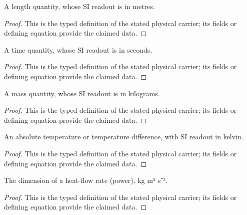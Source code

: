 \begin{definition}
  \label{def:physics:IPhO_2026_4_C_6:aux001}
  A length quantity, whose SI readout is in metres.
\end{definition}
\begin{proof}
  This is the typed definition of the stated physical carrier; its fields or defining equation provide the claimed data.
\end{proof}

\begin{definition}
  \label{def:physics:IPhO_2026_4_C_6:aux002}
  A time quantity, whose SI readout is in seconds.
\end{definition}
\begin{proof}
  This is the typed definition of the stated physical carrier; its fields or defining equation provide the claimed data.
\end{proof}

\begin{definition}
  \label{def:physics:IPhO_2026_4_C_6:aux003}
  A mass quantity, whose SI readout is in kilograms.
\end{definition}
\begin{proof}
  This is the typed definition of the stated physical carrier; its fields or defining equation provide the claimed data.
\end{proof}

\begin{definition}
  \label{def:physics:IPhO_2026_4_C_6:aux004}
  An absolute temperature or temperature difference, with SI readout in kelvin.
\end{definition}
\begin{proof}
  This is the typed definition of the stated physical carrier; its fields or defining equation provide the claimed data.
\end{proof}

\begin{definition}
  \label{def:physics:IPhO_2026_4_C_6:aux005}
  The dimension of a heat-flow rate (power), kg m² s⁻³.
\end{definition}
\begin{proof}
  This is the typed definition of the stated physical carrier; its fields or defining equation provide the claimed data.
\end{proof}

